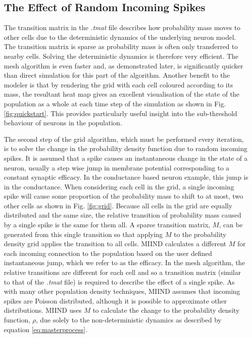 \documentclass[utf8]{frontiersSCNS} %
\begin{document}
\subsection{The Effect of Random Incoming Spikes}
The transition matrix in the \textit{.tmat} file describes how probability mass moves to other cells due to the deterministic dynamics of the underlying neuron model. The transition matrix is sparse as probability mass is often only transferred to nearby cells. Solving the deterministic dynamics is therefore very efficient. The mesh algorithm is even faster and, as demonstrated later, is significantly quicker than direct simulation for this part of the algorithm. Another benefit to the modeler is that by rendering the grid with each cell coloured according to its mass, the resultant heat map gives an excellent visualisation of the state of the population as a whole at each time step of the simulation as shown in Fig. \ref{fig:quickstart}. This provides particularly useful insight into the sub-threshold behaviour of neurons in the population.

The second step of the grid algorithm, which must be performed every iteration, is to solve the change in the probability density function due to random incoming spikes. It is assumed that a spike causes an instantaneous change in the state of a neuron, usually a step wise jump in membrane potential corresponding to a constant synaptic efficacy. In the conductance based neuron example, this jump is in the conductance. When considering each cell in the grid, a single incoming spike will cause some proportion of the probability mass to shift to at most, two other cells as shown in Fig. \ref{fig:grid}. Because all cells in the grid are equally distributed and the same size, the relative transition of probability mass caused by a single spike is the same for them all. A sparse transition matrix, $M$, can be generated from this single transition so that applying $M$ to the probability density grid applies the transition to all cells. MIIND calculates a different $M$ for each incoming connection to the population based on the user defined instantaneous jump, which we refer to as the efficacy. In the mesh algorithm, the relative transitions are different for each cell and so a transition matrix (similar to that of the \textit{.tmat} file) is required to describe the effect of a single spike. As with many other population density techniques, MIIND assumes that incoming spikes are Poisson distributed, although it is possible to approximate other distributions. MIIND uses $M$ to calculate the change to the probability density function, $\rho$, due solely to the non-deterministic dynamics as described by equation \ref{eq:masterprocess}.
\end{document}
